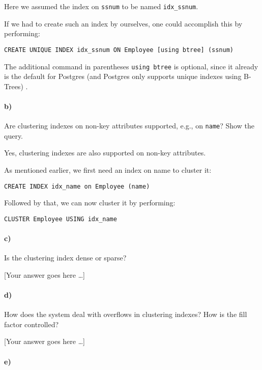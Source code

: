 \documentclass[11pt]{scrartcl}
\newcommand{\youranswerhere}{[Your answer goes here \ldots]}
\begin{document}
Here we assumed the index on \texttt{ssnum} to be named \texttt{idx\_ssnum}.

If we had to create such an index by ourselves, one could accomplish this by performing:
\begin{lstlisting}[style=dbtsql]
CREATE UNIQUE INDEX idx_ssnum ON Employee [using btree] (ssnum)
\end{lstlisting}

The additional command in parentheses \texttt{using btree} is optional, since it already is the default for Postgres
(and Postgres only supports unique indexes using B-Trees) \cite{PostgreSQL2023Unique}.

\paragraph{b)}

Are clustering indexes on non-key attributes supported, e.g., on \texttt{name}? Show the query.

Yes, clustering indexes are also supported on non-key attributes.

As mentioned earlier, we first need an index on name to cluster it:

\begin{lstlisting}[style=dbtsql]
CREATE INDEX idx_name on Employee (name)
\end{lstlisting}

Followed by that, we can now cluster it by performing:

\begin{lstlisting}[style=dbtsql]
CLUSTER Employee USING idx_name
\end{lstlisting}

\paragraph{c)}

Is the clustering index dense or sparse?

\youranswerhere{}

\paragraph{d)}

How does the system deal with overflows in clustering indexes? How is the fill factor controlled?

\youranswerhere{}

\paragraph{e)}
\end{document}
